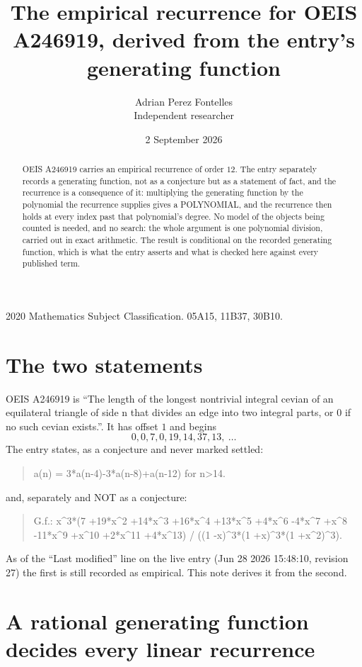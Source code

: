 \documentclass[11pt,a4paper]{article}
\title{The empirical recurrence for OEIS A246919, derived from the entry's generating function}
\author{Adrian Perez Fontelles\\ \small Independent researcher}
\date{2 September 2026}
\theoremstyle{plain}
\theoremstyle{definition}
\begin{document}
\maketitle

\begin{abstract}
OEIS A246919 carries an empirical recurrence of order $12$. The entry separately records a
generating function, not as a conjecture but as a statement of fact, and the recurrence is a
consequence of it: multiplying the generating function by the polynomial the recurrence
supplies gives a POLYNOMIAL, and the recurrence then holds at every index past that
polynomial's degree. No model of the objects being counted is needed, and no search: the
whole argument is one polynomial division, carried out in exact arithmetic. The result is
conditional on the recorded generating function, which is what the entry asserts and what is
checked here against every published term.
\end{abstract}

\noindent\small 2020 Mathematics Subject Classification. 05A15, 11B37, 30B10.\normalsize

\section{The two statements}

OEIS A246919 is ``The length of the longest nontrivial integral cevian of an equilateral triangle of side n that divides an edge into two integral parts, or 0 if no such cevian exists.''. It has offset $1$ and begins
\[
0, 0, 7, 0, 19, 14, 37, 13,\ \dots
\]
The entry states, as a conjecture and never marked settled:
\begin{quote}
a(n) = 3*a(n-4)-3*a(n-8)+a(n-12) for n>14.
\end{quote}
and, separately and NOT as a conjecture:
\begin{quote}
G.f.: x\^{}3*(7 +19*x\^{}2 +14*x\^{}3 +16*x\^{}4 +13*x\^{}5 +4*x\^{}6 -4*x\^{}7 +x\^{}8 -11*x\^{}9 +x\^{}10 +2*x\^{}11 +4*x\^{}13) / ((1 -x)\^{}3*(1 +x)\^{}3*(1 +x\^{}2)\^{}3).
\end{quote}
As of the ``Last modified'' line on the live entry (Jun 28 2026 15:48:10, revision 27) the first is still
recorded as empirical. This note derives it from the second.

\section{A rational generating function decides every linear recurrence}
\end{document}
